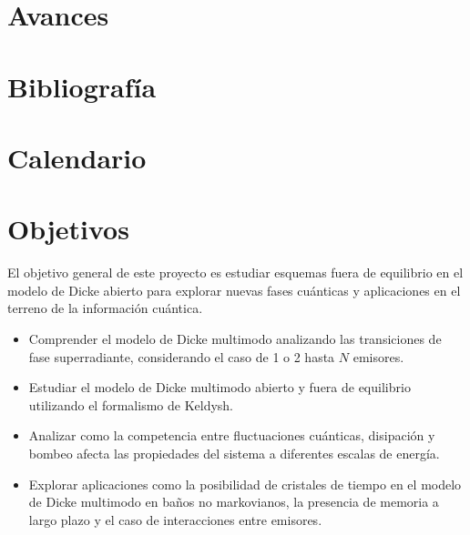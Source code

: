 \documentclass[onecolumn,notitlepage,letterpaper,aps,pra,12pt]{article}
\numberwithin{equation}{section}
\begin{document}
\section{Avances}






\section{Bibliografía}

\printbibliography[heading=none]

\section{Calendario}





\clearpage


\section{Objetivos}

El objetivo general de este proyecto es estudiar esquemas fuera de equilibrio en el modelo de Dicke abierto para explorar nuevas fases cuánticas y aplicaciones en el terreno de la información cuántica. 

\begin{itemize}
    \item Comprender el modelo de Dicke multimodo analizando las transiciones de fase superradiante, considerando el caso de 1 o 2 hasta $N$ emisores.
    \item Estudiar el modelo de Dicke multimodo abierto y fuera de equilibrio utilizando el formalismo de Keldysh. 
    \item Analizar como la competencia entre fluctuaciones cuánticas, disipación y bombeo afecta las propiedades del sistema a diferentes escalas de energía. 
    \item Explorar aplicaciones como la posibilidad de cristales de tiempo en el modelo de Dicke multimodo en baños no markovianos, la presencia de memoria a largo plazo y el caso de interacciones entre emisores. 
\end{itemize}
\end{document}

